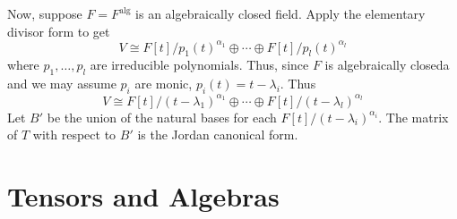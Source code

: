 \documentclass[11pt, a4paper]{memoir}
\theoremstyle{change}
\theoremstyle{plain}
\theoremstyle{nonumberplain}
\numberwithin{equation}{section}
\begin{document}
Now, suppose $F=F^{\text{alg}}$ is an algebraically closed field.
Apply the elementary divisor form to get
\begin{equation*}
    V\cong F[t]/p_1(t)^{\alpha_1}\oplus\cdots\oplus F[t]/p_l(t)^{\alpha_l}
\end{equation*}
where $p_1,\ldots,p_l$ are irreducible polynomials.
Thus, since $F$ is algebraically closeda and we may assume $p_i$ are monic, $p_i(t)=t-\lambda_i$.
Thus
\begin{equation*}
    V\cong F[t]/(t-\lambda_1)^{\alpha_1}\oplus\cdots\oplus F[t]/(t-\lambda_l)^{\alpha_l}
\end{equation*}
Let $B'$ be the union of the natural bases for each $F[t]/(t-\lambda_i)^{\alpha_i}$.
The matrix of $T$ with respect to $B'$ is the Jordan canonical form.
\chapter{Tensors and Algebras}
\end{document}
